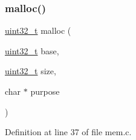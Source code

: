 \subsubsection{\texorpdfstring{malloc()}{malloc()}}
{\footnotesize\ttfamily \hyperlink{a00095_a435d1572bf3f880d55459d9805097f62_a435d1572bf3f880d55459d9805097f62}{uint32\+\_\+t} malloc (\begin{DoxyParamCaption}\item[{\hyperlink{a00095_a435d1572bf3f880d55459d9805097f62_a435d1572bf3f880d55459d9805097f62}{uint32\+\_\+t}}]{base,  }\item[{\hyperlink{a00095_a435d1572bf3f880d55459d9805097f62_a435d1572bf3f880d55459d9805097f62}{uint32\+\_\+t}}]{size,  }\item[{char $\ast$}]{purpose }\end{DoxyParamCaption})}



Definition at line 37 of file mem.\+c.


